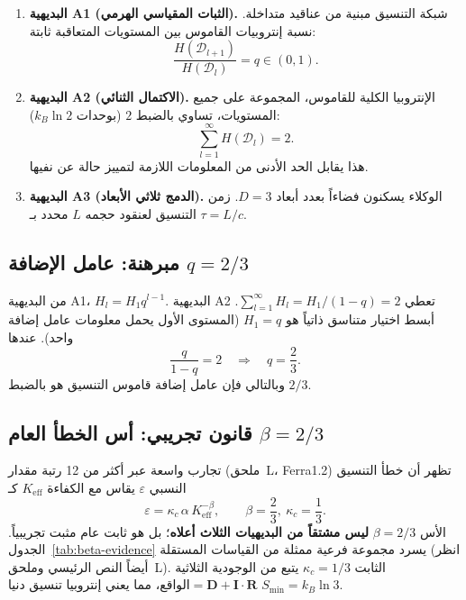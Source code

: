 \documentclass[11pt,a4paper]{article}
\begin{document}
	\begin{enumerate}
		\item \textbf{البديهية A1 (الثبات المقياسي الهرمي).} شبكة التنسيق مبنية من عناقيد متداخلة. نسبة إنتروبيات القاموس بين المستويات المتعاقبة ثابتة:
		\[
		\frac{H(\mathcal{D}_{l+1})}{H(\mathcal{D}_l)} = q \in (0,1).
		\]
		
		\item \textbf{البديهية A2 (الاكتمال الثنائي).} الإنتروبيا الكلية للقاموس، المجموعة على جميع المستويات، تساوي بالضبط \(2\) (بوحدات \(k_B\ln 2\)):
		\[
		\sum_{l=1}^{\infty} H(\mathcal{D}_l) = 2.
		\]
		هذا يقابل الحد الأدنى من المعلومات اللازمة لتمييز حالة عن نفيها.
		
		\item \textbf{البديهية A3 (الدمج ثلاثي الأبعاد).} الوكلاء يسكنون فضاءاً بعدد أبعاد \(D=3\). زمن التنسيق لعنقود حجمه \(L\) محدد بـ \(\tau = L/c\).
	\end{enumerate}
	
	\subsection{مبرهنة: عامل الإضافة \(q = 2/3\)}
	
	من البديهية A1، \(H_l = H_1 q^{l-1}\). البديهية A2 تعطي \(\sum_{l=1}^\infty H_l = H_1/(1-q) = 2\). أبسط اختيار متناسق ذاتياً هو \(H_1 = q\) (المستوى الأول يحمل معلومات عامل إضافة واحد). عندها
	\[
	\frac{q}{1-q} = 2 \quad\Longrightarrow\quad \boxed{q = \frac{2}{3}}.
	\]
	وبالتالي فإن عامل إضافة قاموس التنسيق هو بالضبط \(2/3\).
	
	\subsection{قانون تجريبي: أس الخطأ العام \(\beta = 2/3\)}
	
	تجارب واسعة عبر أكثر من 12 رتبة مقدار (ملحق~L، Ferra1.2) تظهر أن خطأ التنسيق النسبي \(\varepsilon\) يقاس مع الكفاءة \(K_{\mathrm{eff}}\) كـ
	\[
	\varepsilon = \kappa_c \, \alpha \, K_{\mathrm{eff}}^{-\beta}, \qquad \boxed{\beta = \frac{2}{3}},\ \kappa_c = \frac{1}{3}.
	\]
	الأس \(\beta = 2/3\) \textbf{ليس مشتقاً من البديهيات الثلاث أعلاه}؛ بل هو ثابت عام مثبت تجريبياً. الجدول~\ref{tab:beta-evidence} يسرد مجموعة فرعية ممثلة من القياسات المستقلة (انظر أيضاً النص الرئيسي وملحق~L). الثابت \(\kappa_c = 1/3\) يتبع من الوجودية الثلاثية \(\text{الواقع} = \mathbf{D} + \mathbf{I}\!\cdot\!\mathbf{R}\)، مما يعني إنتروبيا تنسيق دنيا \(S_{\min}=k_B\ln 3\).
	
\end{document}
